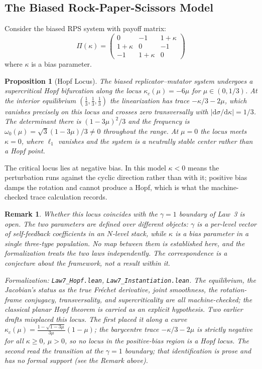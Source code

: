 \documentclass[12pt]{article}
\newtheorem{proposition}[theorem]{Proposition}
\newtheorem{remark}{Remark}[section]
\begin{document}
\subsection{The Biased Rock-Paper-Scissors Model}

Consider the biased RPS system with payoff matrix:
\[
\Pi(\kappa) = \begin{pmatrix} 0 & -1 & 1+\kappa \\ 1+\kappa & 0 & -1 \\ -1 & 1+\kappa & 0 \end{pmatrix}
\]
where $\kappa$ is a bias parameter.

\begin{proposition}[Hopf Locus]
\label{prop:hopf-threshold}
The biased replicator--mutator system undergoes a supercritical Hopf bifurcation
along the locus $\kappa_c(\mu) = -6\mu$ for $\mu \in (0,1/3)$. At the interior
equilibrium $(\tfrac13,\tfrac13,\tfrac13)$ the linearization has trace
$-\kappa/3 - 2\mu$, which vanishes precisely on this locus and crosses zero
transversally with $|\mathrm{d}\sigma/\mathrm{d}\kappa| = 1/3$. The determinant
there is $(1-3\mu)^2/3$ and the frequency is
$\omega_0(\mu) = \sqrt{3}(1-3\mu)/3 \neq 0$ throughout the range. At $\mu = 0$
the locus meets $\kappa = 0$, where $\ell_1$ vanishes and the system is a
neutrally stable center rather than a Hopf point.
\end{proposition}

The critical locus lies at negative bias. In this model $\kappa < 0$ means the
perturbation runs against the cyclic direction rather than with it; positive
bias damps the rotation and cannot produce a Hopf, which is what the
machine-checked trace calculation records.

\begin{remark}
Whether this locus coincides with the $\gamma = 1$ boundary of Law~3 is open.
The two parameters are defined over different objects: $\gamma$ is a per-level
vector of self-feedback coefficients in an $N$-level stack, while $\kappa$ is a
bias parameter in a single three-type population. No map between them is
established here, and the formalization treats the two laws independently. The
correspondence is a conjecture about the framework, not a result within it.
\end{remark}
\noindent\textit{Formalization: \texttt{Law7\_Hopf.lean}, \texttt{Law7\_Instantiation.lean}. The equilibrium, the Jacobian's status as the true Fr\'echet derivative, joint smoothness, the rotation-frame conjugacy, transversality, and supercriticality are all machine-checked; the classical planar Hopf theorem is carried as an explicit hypothesis. Two earlier drafts misplaced this locus. The first placed it along a curve $\kappa_c(\mu) = \frac{1 - \sqrt{1-3\mu}}{3\mu}(1-\mu)$; the barycentre trace $-\kappa/3 - 2\mu$ is strictly negative for all $\kappa \geq 0$, $\mu > 0$, so no locus in the positive-bias region is a Hopf locus. The second read the transition at the $\gamma = 1$ boundary; that identification is prose and has no formal support (see the Remark above).}
\end{document}
